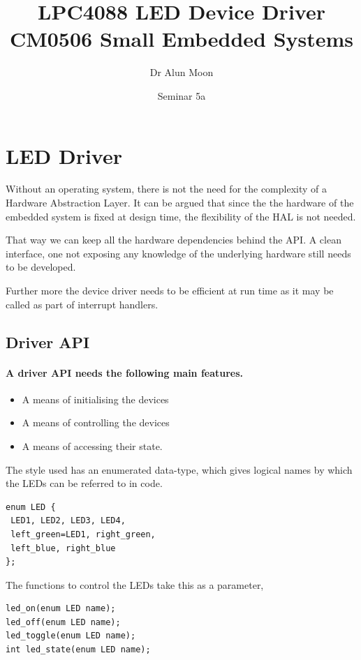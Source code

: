 \documentclass[a4paper]{tufte-handout}
\title{LPC4088 LED Device Driver\\\small{CM0506 Small Embedded Systems}}
\author{Dr Alun Moon}
\date{Seminar 5a}
\begin{document}
\maketitle
\section{LED Driver}
Without an operating system, there is not the need for the complexity
of a Hardware Abstraction Layer.  It can be argued that since the the
hardware of the embedded system is fixed at design time, the
flexibility of the HAL is not needed.
 
  That way we can keep all the hardware dependencies behind
the API.  A clean interface, one not exposing any knowledge of the
underlying hardware still needs to be developed.

Further more the device driver needs to be efficient at run time as it
may be called as part of interrupt handlers.

\subsection{Driver API}
\paragraph{A driver API needs the following main features.}
\begin{itemize}
\item A means of initialising the devices
\item A means of controlling the devices
\item A means of accessing their state.
\end{itemize}

The style used has an enumerated data-type, which gives logical names by
which the LEDs can be referred to in code.
\begin{verbatim}
enum LED {
 LED1, LED2, LED3, LED4,
 left_green=LED1, right_green,
 left_blue, right_blue
};
\end{verbatim}
The functions to control the LEDs take this as a parameter,
\begin{verbatim}
led_on(enum LED name);
led_off(enum LED name);
led_toggle(enum LED name);
int led_state(enum LED name);
\end{verbatim}
\end{document}
